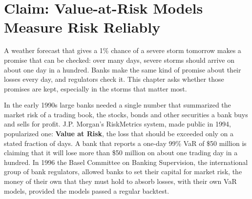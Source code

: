 \makeatletter
{}
\makeatother

\chapter{Claim: Value-at-Risk Models Measure Risk Reliably}
\label{ch:08}

A weather forecast that gives a 1\% chance of a severe storm tomorrow makes a promise that can be checked: over many days, severe storms should arrive on about one day in a hundred. Banks make the same kind of promise about their losses every day, and regulators check it. This chapter asks whether those promises are kept, especially in the storms that matter most.

In the early 1990s large banks needed a single number that summarized the market risk of a trading book, the stocks, bonds and other securities a bank buys and sells for profit. J.P. Morgan's RiskMetrics system, made public in 1994, popularized one: \textbf{Value at Risk}, the loss that should be exceeded only on a stated fraction of days. A bank that reports a one-day 99\% VaR of \$50 million is claiming that it will lose more than \$50 million on about one trading day in a hundred. In 1996 the Basel Committee on Banking Supervision, the international group of bank regulators, allowed banks to set their capital for market risk, the money of their own that they must hold to absorb losses, with their own VaR models, provided the models passed a regular backtest.


